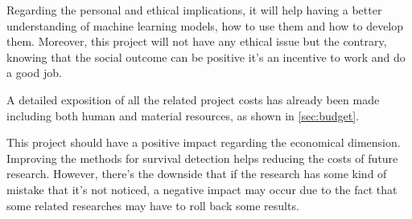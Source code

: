 Regarding the personal and ethical implications, it will help having a better understanding
of machine learning models, how to use them and how to develop them. Moreover, this project
will not have any ethical issue but the contrary, knowing that the social outcome can be
positive it's an incentive to work and do a good job.


A detailed exposition of all the related project costs has already been made including both
human and material resources, as shown in \autoref{sec:budget}.

This project should have a positive impact regarding the economical dimension. Improving
the methods for survival detection helps reducing the costs of future research. However, 
there's the downside that if the research has some kind of mistake that it's not noticed,
a negative impact may occur due to the fact that some related researches may have to roll
back some results.

